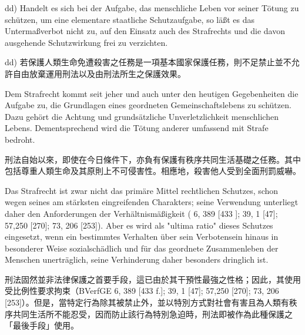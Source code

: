 \documentclass[12pt]{article}
\begin{document}
\begin{sourcepara}[title={原文D.54}]
dd) Handelt es sich bei der Aufgabe, das menschliche Leben vor seiner Tötung zu schützen, um eine elementare staatliche Schutzaufgabe, so läßt es das Untermaßverbot nicht zu, auf den Einsatz auch des Strafrechts und die davon ausgehende Schutzwirkung frei zu verzichten.
\end{sourcepara}
\begin{transpara}
dd) 若保護人類生命免遭殺害之任務是一項基本國家保護任務，則不足禁止並不允許自由放棄運用刑法以及由刑法所生之保護效果。
\end{transpara}

\begin{sourcepara}[title={原文D.55}]
Dem Strafrecht kommt seit jeher und auch unter den heutigen Gegebenheiten die Aufgabe zu, die Grundlagen eines geordneten Gemeinschaftslebens zu schützen. Dazu gehört die Achtung und grundsätzliche Unverletzlichkeit menschlichen Lebens. Dementsprechend wird die Tötung anderer umfassend mit Strafe bedroht.
\end{sourcepara}
\begin{transpara}
刑法自始以來，即使在今日條件下，亦負有保護有秩序共同生活基礎之任務。其中包括尊重人類生命及其原則上不可侵害性。相應地，殺害他人受到全面刑罰威嚇。
\end{transpara}

\begin{sourcepara}[title={原文D.56}]
Das Strafrecht ist zwar nicht das primäre Mittel rechtlichen Schutzes, schon wegen seines am stärksten eingreifenden Charakters; seine Verwendung unterliegt daher den Anforderungen der Verhältnismäßigkeit (\abbrBVerfGE{} 6, 389 [433 \abbrF{}]; 39, 1 [47]; 57,250 [270]; 73, 206 [253]). Aber es wird als "ultima ratio" dieses Schutzes eingesetzt, wenn ein bestimmtes Verhalten über sein Verbotensein hinaus in besonderer Weise sozialschädlich und für das geordnete Zusammenleben der Menschen unerträglich, seine Verhinderung daher besonders dringlich ist.
\end{sourcepara}
\begin{transpara}
刑法固然並非法律保護之首要手段，這已由於其干預性最強之性格；因此，其使用受比例性要求拘束（BVerfGE 6, 389 [433 f.]; 39, 1 [47]; 57,250 [270]; 73, 206 [253]）。但是，當特定行為除其被禁止外，並以特別方式對社會有害且為人類有秩序共同生活所不能忍受，因而防止該行為特別急迫時，刑法即被作為此種保護之「最後手段」使用。
\end{transpara}
\end{document}
